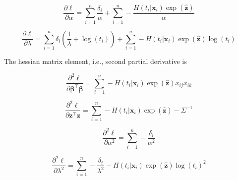 \documentclass[preprint,12pt]{elsarticle}
\begin{document}
\begin{equation}
    \frac{\partial\ell}{\partial\alpha}=\sum_{i=1}^n\frac{\delta_i}{\alpha} + \sum_{i=1}^n-\frac{H(t_i|\mathbf{x}_i)\exp(\hat{\mathbf{z}})}{\alpha}
\end{equation}

\begin{equation}
    \frac{\partial\ell}{\partial\lambda}=\sum_{i=1}^n\delta_i(\frac{1}{\lambda}+\log (t_i))+\sum_{i=1}^n-H(t_i|\mathbf{x}_i)\exp(\hat{\mathbf{z}})\log (t_i)
\end{equation}

The hessian matrix element, i.e., second partial derivative is 

\begin{equation}
    \frac{\partial^2\ell}{\partial\boldsymbol{\beta}^{\top}\boldsymbol{\beta}}=\sum_{i=1}^n-H(t_i|\mathbf{x}_i)\exp(\hat{\mathbf{z}})x_{ij}x_{ik}
\end{equation}

\begin{equation}
    \frac{\partial^2\ell}{\partial\mathbf{z}^{\top}\mathbf{z}}=\sum_{i=1}^n-H(t_i|\mathbf{x}_i)\exp(\hat{\mathbf{z}})-\Sigma^{-1}
\end{equation}

\begin{equation}
    \frac{\partial^2\ell}{\partial\alpha^2}=\sum_{i=1}^n-\frac{\delta_i}{\alpha^2}
\end{equation}

\begin{equation}
    \frac{\partial^2\ell}{\partial\lambda^2}=\sum_{i=1}^n-\frac{\delta_i}{\lambda^2}-H(t_i|\mathbf{x}_i)\exp(\hat{\mathbf{z}})\log(t_i)^2
\end{equation}
\end{document}
